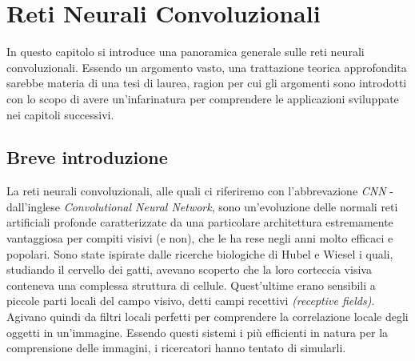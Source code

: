 
\chapter{Reti Neurali Convoluzionali} %
\label{Capitolo3}
\def \teoria {Figures/teoria}
\def \path	 {Figures/C3}
In questo capitolo si introduce una panoramica generale sulle reti neurali convoluzionali. Essendo un argomento vasto, una trattazione teorica approfondita sarebbe materia di una tesi di laurea, ragion per cui gli argomenti sono introdotti con lo scopo di avere un'infarinatura per comprendere le applicazioni sviluppate nei capitoli successivi. 
\section{Breve introduzione}
La reti neurali convoluzionali, alle quali ci riferiremo con l'abbrevazione \emph{CNN} - dall'inglese \emph{Convolutional Neural Network}, sono un'evoluzione delle normali reti artificiali profonde caratterizzate da una particolare architettura estremamente vantaggiosa per compiti visivi (e non), che le ha rese negli anni molto efficaci e popolari. Sono state ispirate dalle ricerche biologiche di Hubel e Wiesel i quali, studiando il cervello dei gatti, avevano scoperto che la loro corteccia visiva conteneva una complessa struttura di cellule. Quest'ultime erano sensibili a piccole parti locali del campo visivo, detti campi recettivi \emph{(receptive fields)}. Agivano quindi da filtri locali perfetti per comprendere la correlazione locale degli oggetti in un'immagine. Essendo questi sistemi i più efficienti in natura per la comprensione delle immagini, i ricercatori hanno tentato di simularli. 


